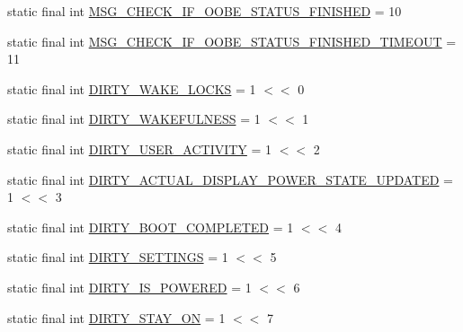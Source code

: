 \begin{DoxyCompactItemize}
\item 
static final int \hyperlink{classcom_1_1android_1_1server_1_1power_1_1PowerManagerService_a2c7b506f2dde25c105c0d47dee339f77}{M\-S\-G\-\_\-\-C\-H\-E\-C\-K\-\_\-\-I\-F\-\_\-\-O\-O\-B\-E\-\_\-\-S\-T\-A\-T\-U\-S\-\_\-\-F\-I\-N\-I\-S\-H\-E\-D} = 10
\item 
static final int \hyperlink{classcom_1_1android_1_1server_1_1power_1_1PowerManagerService_aaa203fb84f55a3de3757bb5c8c55c756}{M\-S\-G\-\_\-\-C\-H\-E\-C\-K\-\_\-\-I\-F\-\_\-\-O\-O\-B\-E\-\_\-\-S\-T\-A\-T\-U\-S\-\_\-\-F\-I\-N\-I\-S\-H\-E\-D\-\_\-\-T\-I\-M\-E\-O\-U\-T} = 11
\item 
static final int \hyperlink{classcom_1_1android_1_1server_1_1power_1_1PowerManagerService_a86a29a49a3fda20bd0c1bc1e4855027a}{D\-I\-R\-T\-Y\-\_\-\-W\-A\-K\-E\-\_\-\-L\-O\-C\-K\-S} = 1 $<$$<$ 0
\item 
static final int \hyperlink{classcom_1_1android_1_1server_1_1power_1_1PowerManagerService_a0fba7f1d5211ae73ed4892ce4a626dde}{D\-I\-R\-T\-Y\-\_\-\-W\-A\-K\-E\-F\-U\-L\-N\-E\-S\-S} = 1 $<$$<$ 1
\item 
static final int \hyperlink{classcom_1_1android_1_1server_1_1power_1_1PowerManagerService_aaa88f26a67b43b8233004080d8ba3614}{D\-I\-R\-T\-Y\-\_\-\-U\-S\-E\-R\-\_\-\-A\-C\-T\-I\-V\-I\-T\-Y} = 1 $<$$<$ 2
\item 
static final int \hyperlink{classcom_1_1android_1_1server_1_1power_1_1PowerManagerService_a95f16117f3e69c495773dcceca519ed9}{D\-I\-R\-T\-Y\-\_\-\-A\-C\-T\-U\-A\-L\-\_\-\-D\-I\-S\-P\-L\-A\-Y\-\_\-\-P\-O\-W\-E\-R\-\_\-\-S\-T\-A\-T\-E\-\_\-\-U\-P\-D\-A\-T\-E\-D} = 1 $<$$<$ 3
\item 
static final int \hyperlink{classcom_1_1android_1_1server_1_1power_1_1PowerManagerService_a8bb7388e3963af1e33be73c255e4f91f}{D\-I\-R\-T\-Y\-\_\-\-B\-O\-O\-T\-\_\-\-C\-O\-M\-P\-L\-E\-T\-E\-D} = 1 $<$$<$ 4
\item 
static final int \hyperlink{classcom_1_1android_1_1server_1_1power_1_1PowerManagerService_afeb55d425191be7b5ad0bbb1f0ff39f4}{D\-I\-R\-T\-Y\-\_\-\-S\-E\-T\-T\-I\-N\-G\-S} = 1 $<$$<$ 5
\item 
static final int \hyperlink{classcom_1_1android_1_1server_1_1power_1_1PowerManagerService_a7c86239146dd241366cacaf2cad9e63e}{D\-I\-R\-T\-Y\-\_\-\-I\-S\-\_\-\-P\-O\-W\-E\-R\-E\-D} = 1 $<$$<$ 6
\item 
static final int \hyperlink{classcom_1_1android_1_1server_1_1power_1_1PowerManagerService_ada85de177fca698c0bcf1b28d47c5e81}{D\-I\-R\-T\-Y\-\_\-\-S\-T\-A\-Y\-\_\-\-O\-N} = 1 $<$$<$ 7

\end{DoxyCompactItemize}
